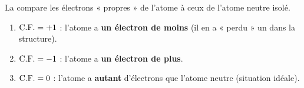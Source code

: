 \documentclass[11pt,a4paper]{article}
\begin{document}
\begin{corrige}
La \CF{} compare les électrons « propres » de l'atome à ceux de l'atome neutre isolé.
\begin{enumerate}[label=\alph*)]
  \item $\mathrm{C.F.} = +1$ : l'atome a \textbf{un électron de moins} (il en a « perdu » un dans la structure).
  \item $\mathrm{C.F.} = -1$ : l'atome a \textbf{un électron de plus}.
  \item $\mathrm{C.F.} = 0$ : l'atome a \textbf{autant} d'électrons que l'atome neutre (situation idéale).
\end{enumerate}
\end{corrige}
\end{document}
